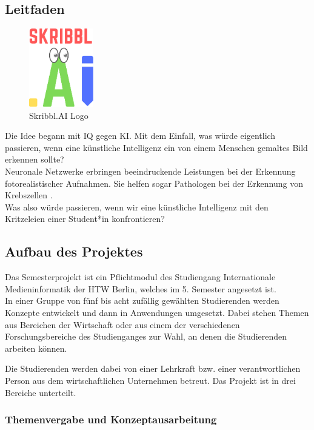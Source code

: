 \documentclass[11pt]{article}
\begin{document}
\subsection{Leitfaden}
\label{chap: leitfaden}
\begin{figure}
\centering
\includegraphics[width=0.25\textwidth]{images/logo_skribbl.png}
\caption{\label{fig:skribblLogo}Skribbl.AI Logo}
\end{figure}
Die Idee begann mit IQ gegen KI. Mit dem Einfall, was würde eigentlich passieren, wenn eine künstliche Intelligenz ein von einem Menschen gemaltes Bild  erkennen sollte? \\
Neuronale Netzwerke erbringen beeindruckende Leistungen bei der Erkennung fotorealistischer Aufnahmen. Sie helfen sogar Pathologen bei der Erkennung von Krebszellen \parencite{ElizabethDougherty2018}.\\
Was also würde  passieren, wenn wir eine künstliche Intelligenz mit den Kritzeleien einer Student*in konfrontieren?
 
\subsection{Aufbau des Projektes}
\label{chap: Aufbau}

Das Semesterprojekt ist ein Pflichtmodul des Studiengang Internationale Medieninformatik der HTW Berlin, welches im 5. Semester angesetzt ist. \\
In einer Gruppe von fünf bis acht zufällig gewählten Studierenden werden Konzepte entwickelt und dann in Anwendungen umgesetzt. Dabei stehen Themen aus Bereichen der Wirtschaft oder aus einem der verschiedenen Forschungsbereiche des Studienganges zur Wahl, an denen die Studierenden arbeiten können.

Die Studierenden werden dabei von einer Lehrkraft bzw. einer verantwortlichen Person aus dem wirtschaftlichen Unternehmen betreut.
Das Projekt ist in drei Bereiche unterteilt.

\subsubsection{ Themenvergabe und Konzeptausarbeitung }
\label{chap: Themenvergabe}
\end{document}
